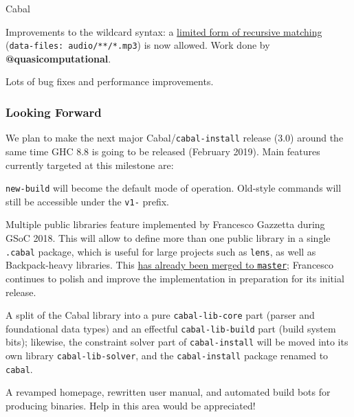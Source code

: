 \begin{hcarentry}{Cabal}
\begin{compactitem}
\item Improvements to the wildcard syntax: a
  \href{https://cabal.readthedocs.io/en/latest/developing-packages.html#pkg-field-data-files}{limited
    form of recursive matching} (\texttt{data-files:~audio/**/*.mp3})
  is now allowed. Work done by \textbf{@quasicomputational}.

\item Lots of bug fixes and performance improvements.

\end{compactitem}

\subsubsection*{Looking Forward}

We plan to make the next major Cabal/\texttt{cabal-install} release
(3.0) around the same time GHC 8.8 is going to be released (February
2019). Main features currently targeted at this milestone are:

\begin{compactitem}

\item \texttt{new-build} will become the default mode of
  operation. Old-style commands will still be accessible under the
  \texttt{v1-} prefix.

\item Multiple public libraries feature implemented by Francesco
  Gazzetta during GSoC 2018. This will allow to define more than one
  public library in a single \texttt{.cabal} package, which is useful
  for large projects such as \texttt{lens}, as well as Backpack-heavy
  libraries. This
  \href{https://github.com/haskell/cabal/pull/5526}{has already been
    merged to \texttt{master}}; Francesco continues to polish and
  improve the implementation in preparation for its initial release.

\item A split of the Cabal library into a pure \texttt{cabal-lib-core}
  part (parser and foundational data types) and an effectful
  \texttt{cabal-lib-build} part (build system bits); likewise, the
  constraint solver part of \texttt{cabal-install} will be
  moved into its own library \texttt{cabal-lib-solver}, and the
  \texttt{cabal-install} package renamed to \texttt{cabal}.

\item A revamped homepage, rewritten user manual, and automated build
  bots for producing binaries. Help in this area would be appreciated!


\end{compactitem}
\end{hcarentry}
